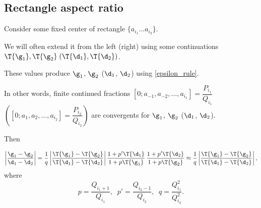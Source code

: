 \subsection{Rectangle aspect ratio}

Consider some fixed center of rectangle $\{a_{i_1} ... a_{i_2}\}$.

We will often extend it from the left (right) using some continuations
$\T{\g_1}, \T{\g_2}\; (\T{\d_1}, \T{\d_2})$.

These values produce $\g_1$, $\g_2$ ($\d_1$, $\d_2$)
using \ref{epsilon_rule}.

In other words, finite continued fractions
$[0; a_{-1}, a_{-2}, ..., a_{i_1}] = \dfrac{P_{i_1}}{Q_{i_1}}$
$\left([0; a_{1}, a_{2}, ..., a_{i_2}] = \dfrac{P_{i_2}}{Q_{i_2}}\right)$
are convergents for $\g_1$, $\g_2$ ($\d_1$, $\d_2$).

Then

\begin{equation}%
	\left| \dfrac{\g_1 - \g_2}{\d_1 - \d_2} \right|
	=
	\dfrac{1}{q}
	\left| \dfrac{\T{\g_1} - \T{\g_2}}
	{\T{\d_1} - \T{\d_2}} \right|
	\dfrac{1 + p' \T{\d_1}}{1 + p \T{\g_1}}\,
	\dfrac{1 + p' \T{\d_2}}{1 + p \T{\g_2}}
	\approx
	\dfrac{1}{q}
	\left| \dfrac{\T{\g_1} - \T{\g_2}}
	{\T{\d_1} - \T{\d_2}} \right|,
\end{equation}
where
\begin{equation*}
	p = \dfrac{Q_{i_1 + 1}}{Q_{i_1}},\;\;
	p' = \dfrac{Q_{i_2 - 1}}{Q_{i_2}},\;\;
	q = \dfrac{Q_{i_1}^2}{Q_{i_2}^2}.
\end{equation*}
